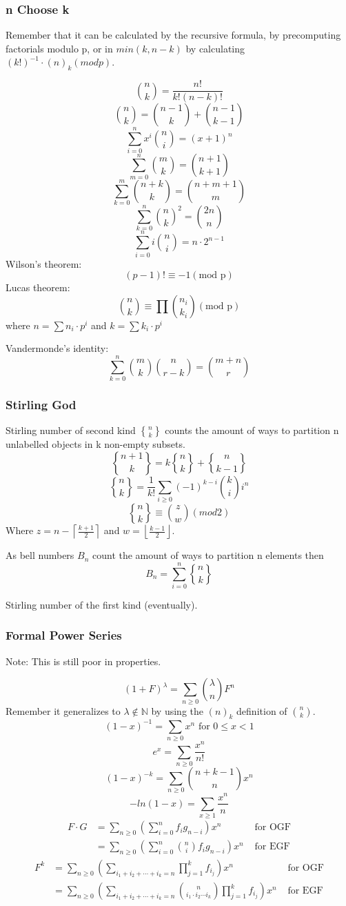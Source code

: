 \documentclass[landscape, 9pt, a4paper, oneside, twocolumn]{extarticle}
\begin{document}
	\subsubsection{n Choose k}
	Remember that it can be calculated by the recursive formula, by precomputing factorials modulo p, or in $min(k,n-k)$ by calculating $(k!)^{-1}\cdot (n)_k (mod p)$.
	
	\[\binom{n}{k}=\frac{n!}{k!(n-k)!}\]
	\[\binom{n}{k}=\binom{n-1}{k}+\binom{n-1}{k-1}\]
	\[\sum_{i=0}^{n} x^i\binom{n}{i} = (x+1)^n\]
	\[\sum_{m=0}^{n}\binom{m}{k} = \binom{n+1}{k+1}\]
	\[ \sum_{k=0}^{m}\binom{n+k}{k} =\binom{n+m+1}{m} \]
	\[\sum_{k=0}^{n}\binom{n}{k}^2 = \binom{2n}{n}\]
	\[\sum_{i=0}^{n}i\binom{n}{i}=n\cdot 2^{n-1}\]
	Wilson's theorem:
	\[(p-1)!\equiv -1 (\text{mod p})\]
	Lucas theorem:
	\[\binom{n}{k}\equiv\prod\binom{n_i}{k_i} (\text{mod p})\]
	where $n=\sum n_i\cdot p^i$ and $k=\sum k_i\cdot p^i$
	
	Vandermonde's identity:
	\[\sum_{k=0}^{n}\binom{m}{k}\binom{n}{r-k}=\binom{m+n}{r}\]
	
	\subsubsection{Stirling God}
	Stirling number of second kind ${n\brace k}$ counts the amount of ways to partition n unlabelled objects in k non-empty subsets. 
	\[{n+1\brace k}=k{n\brace k}+{n\brace k-1}\]
	\[{n\brace k}=\frac{1}{k!}\sum_{i\geq 0} (-1)^{k-i}\binom{k}{i}i^n\]
	\[{n\brace k}\equiv\binom{z}{w} (mod 2)\] 
	Where $z=n-\left\lceil\frac{k+1}{2}\right\rceil$ and $w=\left\lfloor\frac{k-1}{2}\right\rfloor$.
	
	As bell numbers $B_n$ count the amount of ways to partition n elements then
	\[B_n=\sum_{i=0}^{n}{n\brace k}\]
	
	Stirling number of the first kind (eventually).
	
	\subsubsection{Formal Power Series}
	Note: This is still poor in properties.
	
	\[(1+F)^\lambda=\sum_{n\geq 0}\binom{\lambda}{n}F^n\]
	Remember it generalizes to $\lambda\notin\mathbb{N}$ by using the $(n)_k$ definition of $\binom{n}{k}$.
	\[(1-x)^{-1}=\sum_{n\geq 0}x^n \text{ for } 0\leq x < 1\]
	\[e^x=\sum_{n\geq 0}\frac{x^n}{n!}\]
	\[(1-x)^{-k}=\sum_{n\geq 0}\binom{n+k-1}{n}x^n\]
	\[-ln(1-x)=\sum_{x\geq 1}\frac{x^n}{n}\]
	\begin{align*}
		F\cdot G &=\sum_{n\geq 0}\left(\sum_{i=0}^nf_ig_{n-i}\right)x^n &\text{ for OGF}\\
		&= \sum_{n\geq 0}\left(\sum_{i=0}^n\binom{n}{i}f_ig_{n-i}\right)x^n &\text{ for EGF}
	\end{align*}
	\begin{align*}
		F^k &=\sum_{n\geq 0}\left(\sum_{i_1+i_2+\cdots +i_k=n}\prod_{j=1}^k f_{i_j}\right)x^n &\text{ for OGF}\\
		&= \sum_{n\geq 0}\left(\sum_{i_1+i_2+\cdots +i_k=n}\binom{n}{i_1\cdot i_2\cdots i_k}\prod_{j=1}^k f_{i_j}\right)x^n &\text{ for EGF}
	\end{align*}
	
\end{document}
